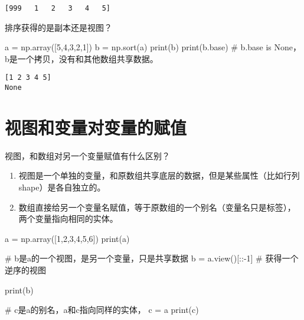 \documentclass[
  letterpaper,
  DIV=11,
  numbers=noendperiod]{scrreprt}
\newenvironment{Shaded}{\begin{snugshade}}{\end{snugshade}}
\newcommand{\BuiltInTok}[1]{\textcolor[rgb]{0.00,0.23,0.31}{#1}}
\newcommand{\CommentTok}[1]{\textcolor[rgb]{0.37,0.37,0.37}{#1}}
\newcommand{\DecValTok}[1]{\textcolor[rgb]{0.68,0.00,0.00}{#1}}
\newcommand{\NormalTok}[1]{\textcolor[rgb]{0.00,0.23,0.31}{#1}}
\newcommand{\OperatorTok}[1]{\textcolor[rgb]{0.37,0.37,0.37}{#1}}
\providecommand{\tightlist}{%
  \setlength{\itemsep}{0pt}\setlength{\parskip}{0pt}}\usepackage{longtable,booktabs,array}
\begin{document}
\begin{verbatim}
[999   1   2   3   4   5]
\end{verbatim}

排序获得的是副本还是视图？

\begin{Shaded}
\begin{Highlighting}[]
\NormalTok{a }\OperatorTok{=}\NormalTok{ np.array([}\DecValTok{5}\NormalTok{,}\DecValTok{4}\NormalTok{,}\DecValTok{3}\NormalTok{,}\DecValTok{2}\NormalTok{,}\DecValTok{1}\NormalTok{])}
\NormalTok{b }\OperatorTok{=}\NormalTok{ np.sort(a)}
\BuiltInTok{print}\NormalTok{(b)}
\BuiltInTok{print}\NormalTok{(b.base) }\CommentTok{\# b.base is None，b是一个拷贝，没有和其他数组共享数据。}
\end{Highlighting}
\end{Shaded}

\begin{verbatim}
[1 2 3 4 5]
None
\end{verbatim}

\hypertarget{ux89c6ux56feux548cux53d8ux91cfux5bf9ux53d8ux91cfux7684ux8d4bux503c}{%
\section{视图和变量对变量的赋值}\label{ux89c6ux56feux548cux53d8ux91cfux5bf9ux53d8ux91cfux7684ux8d4bux503c}}

视图，和数组对另一个变量赋值有什么区别？

\begin{enumerate}
\def\labelenumi{\arabic{enumi}.}
\tightlist
\item
  视图是一个单独的变量，和原数组共享底层的数据，但是某些属性（比如行列shape）是各自独立的。
\item
  数组直接给另一个变量名赋值，等于原数组的一个别名（变量名只是标签），两个变量指向相同的实体。
\end{enumerate}

\begin{Shaded}
\begin{Highlighting}[]
\NormalTok{a }\OperatorTok{=}\NormalTok{ np.array([}\DecValTok{1}\NormalTok{,}\DecValTok{2}\NormalTok{,}\DecValTok{3}\NormalTok{,}\DecValTok{4}\NormalTok{,}\DecValTok{5}\NormalTok{,}\DecValTok{6}\NormalTok{])}
\BuiltInTok{print}\NormalTok{(a)}

\CommentTok{\# b是a的一个视图，是另一个变量，只是共享数据}
\NormalTok{b }\OperatorTok{=}\NormalTok{ a.view()[::}\OperatorTok{{-}}\DecValTok{1}\NormalTok{]  }\CommentTok{\# 获得一个逆序的视图}

\BuiltInTok{print}\NormalTok{(b)}

\CommentTok{\# c是a的别名，a和c指向同样的实体，}
\NormalTok{c }\OperatorTok{=}\NormalTok{ a}
\BuiltInTok{print}\NormalTok{(c)}
\end{Highlighting}
\end{Shaded}
\end{document}
